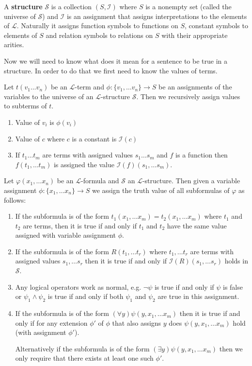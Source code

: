 \begin{defn} A \textbf{structure} $\mathcal{S}$ is a collection $(S,\mathcal{I})$ where $S$ is a nonempty set (called the universe of $\mathcal{S}$) and $\mathcal{I}$ is an assignment that assigns interpretations to the elements of $\mathcal{L}$. Naturally it assigns function symbols to functions on $S$, constant symbols to elements of $S$ and relation symbols to relations on $S$ with their appropriate arities.
\end{defn}

Now we will need to know what does it mean for a sentence to be true in a structure. In order to do that we first need to know the values of terms.

\begin{defn}
Let $t(v_1\dots v_n)$ be an $\mathcal{L}$-term and $\phi:\{v_1,\dots v_n\}\longrightarrow S$ be an assignments of the variables to the universe of an $\mathcal{L}$-structure $\mathcal{S}$. Then we recursively assign values to subterms of $t$.
\begin{enumerate}
	\item Value of $v_i$ is $\phi(v_i)$
	\item Value of $c$ where $c$ is a constant is $\mathcal{I}(c)$
	\item If $t_1\dots t_m$ are terms with assigned values $s_1\dots s_m$ and $f$ is a function then $f(t_1,\dots t_m)$ is assigned the value $\mathcal{I}(f)(s_1,\dots s_m)$.
\end{enumerate}
\end{defn}

\begin{defn}
	Let $\varphi(x_1,\dots x_n)$ be an $\mathcal{L}$-formula and $\mathcal{S}$ an $\mathcal{L}$-structure. Then given a variable assignment $\phi:\{x_1,\dots x_n\}\longrightarrow S$ we assign the truth value of all subformulas of $\varphi$ as follows:
\begin{enumerate}
	\item If the subformula is of the form $t_1(x_1,\dots x_m)=t_2(x_1,\dots x_m)$ where $t_1$ and $t_2$ are terms, then it is true if and only if $t_1$ and $t_2$ have the same value assigned with variable assignment $\phi$.
	\item If the subformula is of the form $R(t_1, \dots t_r)$ where $t_1, \dots t_r$ are terms with assigned values $s_1, \dots s_r$ then it is true if and only if $\mathcal{I}(R)(s_1,\dots s_r)$ holds in $\mathcal{S}$.
	\item Any logical operators work as normal, e.g. $\neg \psi$ is true if and only if $\psi$ is false or $\psi_1 \wedge \psi_2$ is true if and only if both $\psi_1$ and $\psi_2$ are true in this assignment. 
	\item If the subformula is of the form $(\forall y) \psi(y,x_1,\dots x_m)$ then it is true if and only if for any extension $\phi'$ of $\phi$ that also assigns $y$ does $\psi(y,x_1,\dots x_m)$ hold (with assignment $\phi'$).
	
	Alternatively if the subformula is of the form $(\exists y)\psi(y,x_1,\dots x_m)$ then we only require that there exists at least one such $\phi'$.
\end{enumerate}
\end{defn}

